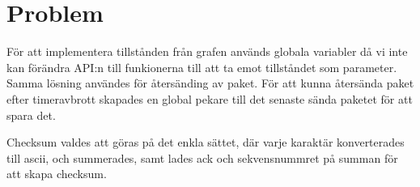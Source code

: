 \section{Problem}
För att implementera tillstånden från grafen används globala variabler då vi inte kan förändra API:n till funkionerna till att ta emot tillståndet som parameter.
Samma lösning användes för återsänding av paket. För att kunna återsända paket efter timeravbrott skapades en global pekare till det senaste sända paketet för att spara det.

Checksum valdes att göras på det enkla sättet, där varje karaktär konverterades till
ascii, och summerades, samt lades ack och sekvensnummret på summan för att skapa
checksum. 
